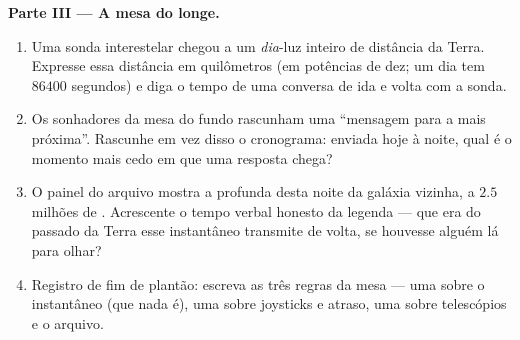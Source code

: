 \begin{problem}
\medskip\noindent\textbf{Parte III --- A mesa do longe.}
\begin{enumerate}[resume]
  \item Uma sonda interestelar chegou a um \emph{dia}-luz inteiro de
        distância da Terra. Expresse essa distância em quilômetros
        (em potências de dez; um dia tem $86400$ segundos) e diga o
        tempo de uma conversa de ida e volta com a sonda.
  \item Os sonhadores da mesa do fundo rascunham uma ``mensagem para
        a  mais próxima''. Rascunhe em vez disso o
        cronograma: enviada hoje à noite, qual é o momento mais cedo
        em que uma resposta chega?
  \item O painel do arquivo mostra a  profunda desta noite da
        galáxia vizinha, a $2.5$ milhões de . Acrescente o
        tempo verbal honesto da legenda --- que era do passado da
        Terra esse instantâneo transmite de volta, se houvesse
        alguém lá para olhar?
  \item Registro de fim de plantão: escreva as três regras da mesa
        --- uma sobre o instantâneo (que nada é), uma sobre joysticks
        e atraso, uma sobre telescópios e o arquivo.
\end{enumerate}
\end{problem}

